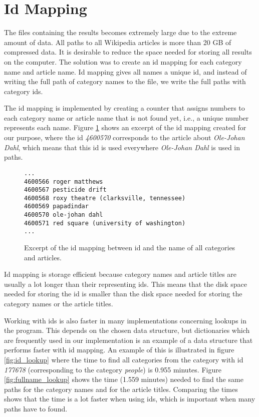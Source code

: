 \section{Id Mapping}
\label{sec:id_mapping}
The files containing the results becomes extremely large due to the extreme amount of data. All paths to all Wikipedia articles is more than 20 GB of compressed data. It is desirable to reduce the space needed for storing all results on the computer. The solution was to create an id mapping for each category name and article name. Id mapping gives all names a unique id, and instead of writing the full path of category names to the file, we write the full paths with category ids. 

The id mapping is implemented by creating a counter that assigns numbers to each category name or article name that is not found yet, i.e., a unique number represents each name. Figure \ref{fig:idmapping} shows an excerpt of the id mapping created for our purpose, where the id \emph{4600570} corresponds to the article about \emph{Ole-Johan Dahl}, which means that this id is used everywhere \emph{Ole-Johan Dahl} is used in paths. 

\begin{figure}[h]
\centering
\begin{lstlisting}
...
4600566 roger matthews
4600567 pesticide drift
4600568 roxy theatre (clarksville, tennessee)
4600569 papadindar
4600570 ole-johan dahl
4600571 red square (university of washington)
...
\end{lstlisting}
\caption[Id mapping example]{Excerpt of the id mapping between id and the name of all categories and articles.}
\label{fig:idmapping}
\end{figure}

Id mapping is storage efficient because category names and article titles are usually a  lot longer than their representing ids. This means that the disk space needed for storing the id is smaller than the disk space needed for storing the category names or the article titles. 

Working with ids is also faster in many implementations concerning lookups in the program. This depends on the chosen data structure, but dictionaries which are frequently used in our implementation is an example of a data structure that performs faster with id mapping. An example of this is illustrated in figure \ref{fig:id_lookup} where the time to find all categories from the category with id \emph{177678} (corresponding to the category \emph{people}) is 0.955 minutes. Figure \ref{fig:fullname_lookup} shows the time (1.559 minutes) needed to find the same paths for the category names and for the article titles. Comparing the times shows that the time is a lot faster when using ids, which is important when many paths have to found.

